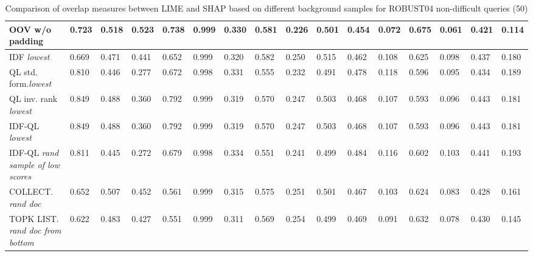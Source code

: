\begin{table}
{\begin{tabular}{ |m{6em}|m{2em}|m{2em}|m{2em}|m{2em}|m{2.8em}||m{2em}|m{2em}|m{2em}|m{2em}|m{2.8em}||m{2em}|m{2em}|m{2em}|m{2em}|m{2.8em}|| }
 OOV w/o padding & 0.723 & 0.518 & 0.523 & 0.738 & 0.999 & 0.330 & 0.581 & 0.226 & 0.501 & 0.454 & 0.072 & 0.675 & 0.061 & 0.421 & 0.114\\ 
 \hline
 IDF \newline \textit{lowest} & 0.669 & 0.471 & 0.441 & 0.652 & 0.999 & 0.320 & 0.582 & 0.250 & 0.515 & 0.462 & 0.108 & 0.625 & 0.098 & 0.437 & 0.180\\
 \hline
 QL std. form.\newline \textit{lowest} & 0.810 & 0.446 & 0.277 & 0.672 & 0.998 & 0.331 & 0.555 & 0.232 & 0.491 & 0.478 & 0.118 & 0.596 & 0.095 & 0.434 & 0.189\\
 \hline
 QL inv. rank \newline \textit{lowest} & 0.849 & 0.488 & 0.360 & 0.792 & 0.999 & 0.319 & 0.570 & 0.247 & 0.503 & 0.468 & 0.107 & 0.593 & 0.096 & 0.443 & 0.181\\
 \hline
 IDF-QL \newline \textit{lowest} & 0.849 & 0.488 & 0.360 & 0.792 & 0.999 & 0.319 & 0.570 & 0.247 & 0.503 & 0.468 & 0.107 & 0.593 & 0.096 & 0.443 & 0.181\\ 
 \hline
 IDF-QL \newline \textit{rand sample of low scores} & 0.811 & 0.445 & 0.272 & 0.679 & 0.998 & 0.334 & 0.551 & 0.241 & 0.499 & 0.484 & 0.116 & 0.602 & 0.103 & 0.441 & 0.193\\ 
 \hline
 COLLECT. \newline \textit{rand doc} & 0.652 & 0.507 & 0.452 & 0.561 & 0.999 & 0.315 & 0.575 & 0.251 & 0.501 & 0.467 & 0.103 & 0.624 & 0.083 & 0.428 & 0.161\\ 
 \hline
 TOPK LIST. \newline \textit{rand doc from bottom} & 0.622 & 0.483 & 0.427 & 0.551 & 0.999 & 0.311 & 0.569 & 0.254 & 0.499 & 0.469 & 0.091 & 0.632 & 0.078 & 0.430 & 0.145\\ 
 \hline
\end{tabular}}
\caption{Comparison of overlap measures between LIME and SHAP based on different background samples for ROBUST04 non-difficult queries (50)}
\label{table_norm_all_terms}
\end{table}

